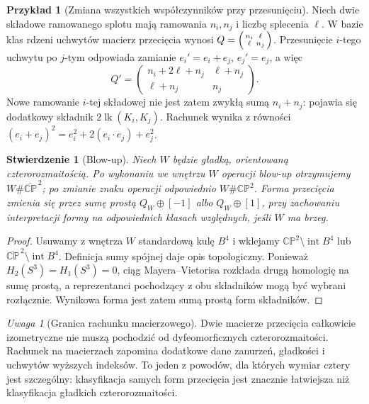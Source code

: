 \documentclass[11pt,a4paper]{report}
\numberwithin{equation}{section}
\theoremstyle{plain}
\newtheorem{stwierdzenie}[twierdzenie]{Stwierdzenie}
\theoremstyle{definition}
\newtheorem{przyklad}[twierdzenie]{Przykład}
\theoremstyle{remark}
\newtheorem{uwaga}[twierdzenie]{Uwaga}
\begin{document}
\begin{przyklad}[Zmiana wszystkich współczynników przy przesunięciu]
Niech dwie składowe ramowanego splotu mają ramowania
$n_i,n_j$ i liczbę splecenia $\ell$. W bazie klas
rdzeni uchwytów macierz przecięcia wynosi
$Q=\begin{psmallmatrix}n_i&\ell\\\ell&n_j\end{psmallmatrix}$.
Przesunięcie $i$-tego uchwytu po $j$-tym odpowiada
zamianie $e_i'=e_i+e_j$, $e_j'=e_j$, a więc
\[
Q'=\begin{pmatrix}n_i+2\ell+n_j&\ell+n_j\\
\ell+n_j&n_j\end{pmatrix}.
\]
Nowe ramowanie $i$-tej składowej nie jest zatem zwykłą
sumą $n_i+n_j$: pojawia się dodatkowy składnik
$2\operatorname{lk}(K_i,K_j)$. Rachunek wynika z
równości $(e_i+e_j)^2=e_i^2+2(e_i\cdot e_j)+e_j^2$.
\end{przyklad}

\begin{stwierdzenie}[Blow-up]
Niech $W$ będzie gładką, orientowaną czterorozmaitością.
Po wykonaniu we wnętrzu $W$ operacji blow-up otrzymujemy
$W\#\overline{\mathbb{CP}}^{\,2}$; po zmianie znaku
operacji odpowiednio $W\#\mathbb{CP}^2$.
Forma przecięcia zmienia się przez sumę prostą
$Q_W\oplus[-1]$ albo $Q_W\oplus[1]$,
przy zachowaniu interpretacji formy na odpowiednich
klasach względnych, jeśli $W$ ma brzeg.
\end{stwierdzenie}

\begin{proof}
Usuwamy z wnętrza $W$ standardową kulę $B^4$ i wklejamy
$\mathbb{CP}^2\setminus\operatorname{int}B^4$ lub
$\overline{\mathbb{CP}}^{\,2}\setminus\operatorname{int}B^4$.
Definicja sumy spójnej daje opis topologiczny.
Ponieważ $H_2(S^3)=H_1(S^3)=0$, ciąg Mayera--Vietorisa
rozkłada drugą homologię na sumę prostą, a reprezentanci
pochodzący z obu składników mogą być wybrani rozłącznie.
Wynikowa forma jest zatem sumą prostą form składników.
\end{proof}

\begin{uwaga}[Granica rachunku macierzowego]
Dwie macierze przecięcia całkowicie izometryczne nie muszą
pochodzić od dyfeomorficznych czterorozmaitości.
Rachunek na macierzach zapomina dodatkowe dane zanurzeń,
gładkości i uchwytów wyższych indeksów. To jeden z powodów,
dla których wymiar cztery jest szczególny: klasyfikacja
samych form przecięcia jest znacznie łatwiejsza niż
klasyfikacja gładkich czterorozmaitości.
\end{uwaga}
\end{document}

